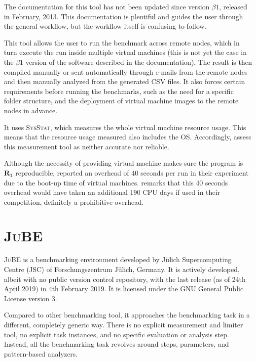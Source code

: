 The documentation for this tool has not been updated since version $\beta1$, released in February, 2013.
This documentation is plentiful and guides the user through the general workflow, but the workflow itself is confusing to follow.

This tool allows the user to run the benchmark across remote nodes, which in turn execute the run inside multiple virtual machines (this is not yet the case in the $\beta1$ version of the software described in the documentation).
The result is then compiled manually or sent automatically through e-mails from the remote nodes and then manually analyzed from the generated CSV files.
It also forces certain requirements before running the benchmarks, such as the need for a specific folder structure, and the deployment of virtual machine images to the remote nodes in advance.

It uses \textsc{SysStat}, which measures the whole virtual machine resource usage.
This means that the resource usage measured also includes the OS.
Accordingly, \cite{beyerReliableBenchmarkingRequirements2019} assess this measurement tool as neither accurate nor reliable.

Although the necessity of providing virtual machine makes sure the program is $\bm{R_1}$ reproducible, \citet{kordonBenchKitToolMassive2014} reported an overhead of 40 seconds per run in their experiment due to the boot-up time of virtual machines.
\cite{beyerReliableBenchmarkingRequirements2019} remarks that this 40 seconds overhead would have taken an additional 190 CPU days if used in their competition, definitely a prohibitive overhead.


\section{\textsc{JuBE}}

\textsc{JuBE} \citep{frings2010flexible} is a benchmarking environment developed by Jülich Supercomputing Centre (JSC) of Forschungszentrum Jülich, Germany.
It is actively developed, albeit with no public version control repository, with the last release (as of 24th April 2019) in 4th February 2019.
It is licensed under the GNU General Public License version 3.

Compared to other benchmarking tool, it approaches the benchmarking task in a different, completely generic way.
There is no explicit measurement and limiter tool, no explicit task instances, and no specific evaluation or analysis step.
Instead, all the benchmarking task revolves around steps, parameters, and pattern-based analyzers.

